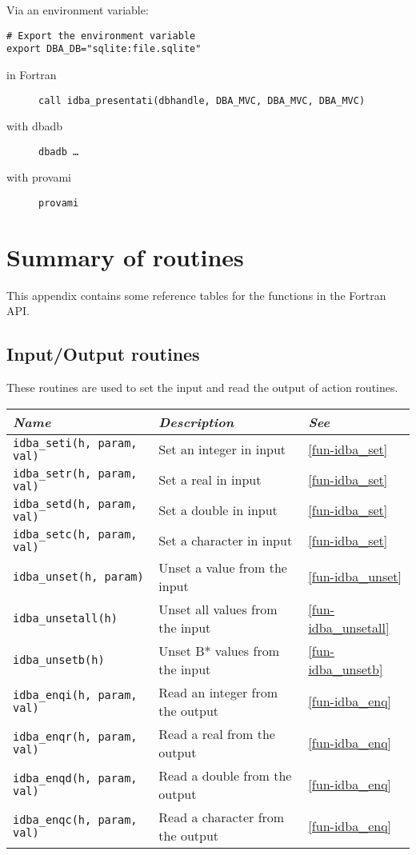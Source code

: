 \documentclass[final,12pt,a4paper,twoside]{book}
\begin{document}
Via an environment variable:

\begin{verbatim}
# Export the environment variable
export DBA_DB="sqlite:file.sqlite"
\end{verbatim}

\begin{description}
\item[in Fortran]
  {\tt call idba\_presentati(dbhandle, DBA\_MVC, DBA\_MVC, DBA\_MVC)}
\item[with dbadb]
  {\tt dbadb \dots}
\item[with provami]
  {\tt provami}
\end{description}


\chapter{Summary of routines}

This appendix contains some reference tables for the functions in the Fortran
API.

\section{Input/Output routines}

These routines are used to set the input and read the output of action routines.

\begin{tabular}{|l|l|l|}
\hline
{\em Name}                      & {\em Description}                & {\em See} \\
\hline
{\tt \small idba\_seti(h, param, val)} & Set an integer in input          & \ref{fun-idba_set} \\
{\tt \small idba\_setr(h, param, val)} & Set a real in input              & \ref{fun-idba_set} \\
{\tt \small idba\_setd(h, param, val)} & Set a double in input            & \ref{fun-idba_set} \\
{\tt \small idba\_setc(h, param, val)} & Set a character in input         & \ref{fun-idba_set} \\
{\tt \small idba\_unset(h, param)}     & Unset a value from the input     & \ref{fun-idba_unset} \\
{\tt \small idba\_unsetall(h)}         & Unset all values from the input  & \ref{fun-idba_unsetall} \\
{\tt \small idba\_unsetb(h)}           & Unset B* values from the input   & \ref{fun-idba_unsetb} \\
{\tt \small idba\_enqi(h, param, val)} & Read an integer from the output  & \ref{fun-idba_enq} \\
{\tt \small idba\_enqr(h, param, val)} & Read a real from the output      & \ref{fun-idba_enq} \\
{\tt \small idba\_enqd(h, param, val)} & Read a double from the output    & \ref{fun-idba_enq} \\
{\tt \small idba\_enqc(h, param, val)} & Read a character from the output & \ref{fun-idba_enq} \\
\hline
\end{tabular}
\end{document}
